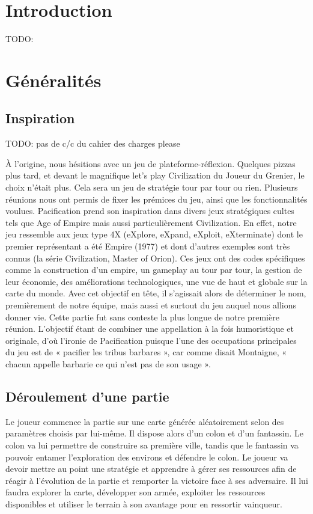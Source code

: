 \documentclass[12pt]{report}
\begin{document}
\chapter{Introduction}

TODO: 

\chapter{Généralités}

\section{Inspiration}

TODO: pas de c/c du cahier des charges please

À l’origine, nous hésitions avec un jeu de plateforme-réflexion. Quelques pizzas
plus tard, et devant le magnifique let’s play Civilization du Joueur du Grenier,
le choix n’était plus. Cela sera un jeu de stratégie tour par tour ou rien.
Plusieurs réunions nous ont permis de fixer les prémices du jeu, ainsi que les
fonctionnalités voulues. Pacification prend son inspiration dans divers jeux
stratégiques cultes tels que Age of Empire mais aussi particulièrement
Civilization. En effet, notre jeu ressemble aux jeux type 4X (eXplore, eXpand,
eXploit, eXterminate) dont le premier représentant a été Empire (1977) et dont
d’autres exemples sont très connus (la série Civilization, Master of Orion). Ces
jeux ont des codes spécifiques comme la construction d’un empire, un gameplay au
tour par tour, la gestion de leur économie, des améliorations technologiques,
une vue de haut et globale sur la carte du monde. Avec cet objectif en tête, il
s’agissait alors de déterminer le nom, premièrement de notre équipe, mais aussi
et surtout du jeu auquel nous allions donner vie. Cette partie fut sans conteste
la plus longue de notre première réunion. L’objectif étant de combiner une
appellation à la fois humoristique et originale, d’où l’ironie de Pacification
puisque l’une des occupations principales du jeu est de « pacifier les tribus
barbares », car comme disait Montaigne, « chacun appelle barbarie ce qui n’est
pas de son usage ».

\section{Déroulement d’une partie}

Le joueur commence la partie sur une carte générée aléatoirement selon des
paramètres choisis par lui-même. Il dispose alors d’un colon et d’un fantassin.
Le colon va lui permettre de construire sa première ville, tandis que le
fantassin va pouvoir entamer l’exploration des environs et défendre le colon. Le
joueur va devoir mettre au point une stratégie et apprendre à gérer ses
ressources afin de réagir à l’évolution de la partie et remporter la victoire
face à ses adversaire. Il lui faudra explorer la carte, développer son armée,
exploiter les ressources disponibles et utiliser le terrain à son avantage pour
en ressortir vainqueur.
\end{document}
